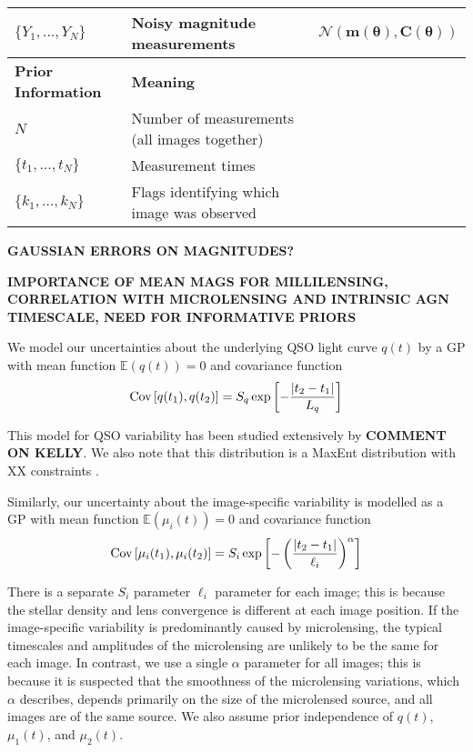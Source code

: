 \documentclass[useAMS,usenatbib, a4paper]{mn2e} \usepackage{natbib}
\newcommand{\params}{\boldsymbol{\theta}}
\begin{document}
\begin{table*}
\begin{tabular}{lll}
\hline
$\{Y_1, ..., Y_N\}$ &	Noisy magnitude measurements	& $\mathcal{N}\left(\mathbf{m}(\params), \mathbf{C}(\params)\right)$\\
\hline
{\bf Prior Information} & {\bf Meaning}			&\\
\hline
$N$		&	Number of measurements (all images together)\\
$\{t_1, ..., t_N\}$ &	Measurement times\\
$\{k_1, ..., k_N\}$ &	Flags identifying which image was observed
\end{tabular}
\caption{A full list of parameters, prior information, and data in the
FLOTSAM model. If there are more than two images, extra parameters are
added accordingly.\label{tab:prior}}
\end{table*}


{\bf GAUSSIAN ERRORS ON MAGNITUDES?}

{\bf IMPORTANCE OF MEAN MAGS FOR MILLILENSING, CORRELATION WITH MICROLENSING AND INTRINSIC AGN TIMESCALE, NEED FOR INFORMATIVE PRIORS}

We model our uncertainties about the underlying QSO light curve $q(t)$ by
a GP with mean function $\mathds{E}\left(q(t)\right) = 0$ and covariance function
\begin{eqnarray}
\textnormal{Cov}\left[q(t_1), q(t_2)\right] = S_q\exp
\left[-\frac{|t_2 - t_1|}{L_q}\right]
\end{eqnarray}

This model for QSO variability has been studied extensively by \citep{}
{\bf COMMENT ON KELLY}. We also note that this distribution is a MaxEnt
distribution \citep{} with XX constraints \citep{sivia}.

Similarly, our uncertainty about the image-specific variability is modelled
as a GP with mean function $\mathds{E}\left(\mu_i(t)\right) = 0$ and
covariance function
\begin{eqnarray}
\textnormal{Cov}\left[\mu_i(t_1), \mu_i(t_2)\right] =
S_i\exp\left[
-\left(\frac{|t_2 - t_1|
}{\ell_i}\right)^\alpha
\right]
\end{eqnarray}

There is a separate $S_i$ parameter $\ell_i$ parameter
for each image; this is because the stellar density and lens convergence is
different at each image position. If the image-specific variability is
predominantly caused by microlensing, the typical timescales and amplitudes
of the microlensing are unlikely to be the same for each image.
In contrast, we use a single $\alpha$ parameter for all images;
this is because it is suspected that the
smoothness of the microlensing variations, which $\alpha$ describes, depends
primarily on the size of the microlensed source, and all images are of the
same source. We also assume
prior independence of $q(t)$, $\mu_1(t)$, and $\mu_2(t)$.
\end{document}
